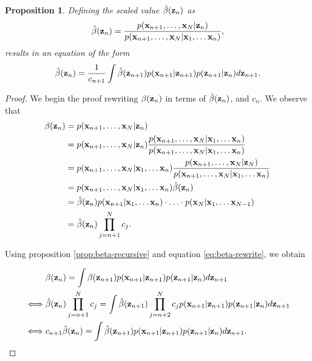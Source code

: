 \documentclass[11pt]{article}
\numberwithin{equation}{section}
\newcommand{\x}{{\bf x}}
\newcommand{\z}{{\bf z}}
\newtheorem{proposition}{Proposition}[section]
\begin{document}
\begin{proposition} \label{prop:beta-hat}
	Defining the scaled value $\hat\beta(\z_n)$ as
	\begin{equation}
		\hat\beta(\z_n) = \frac{p(\x_{n+1}, \ldots, \x_N \vert \z_n)}{p(\x_{n+1}, \ldots, \x_N \vert \x_1, \ldots \x_n)},
	\end{equation}
	results in an equation of the form
	\begin{equation}
		\hat\beta(\z_n) = \frac{1}{c_{n+1}}\int \hat\beta(\z_{n+1})p(\x_{n+1}\vert\z_{n+1})p(\z_{n+1}\vert\z_n) d\z_{n+1}.
	\end{equation}
\end{proposition}

\begin{proof}
	We begin the proof rewriting $\beta(\z_n)$ in terms of $\hat\beta(\z_n)$, and $c_n$. We observe that
	\begin{align}
		\beta(\z_n) &= p(\x_{n+1}, \ldots, \x_N \vert \z_n)\\
		&= p(\x_{n+1}, \ldots, \x_N \vert \z_n) \frac{p(\x_{n+1}, \ldots, \x_N \vert \x_1, \ldots \x_n)}{p(\x_{n+1}, \ldots, \x_N \vert \x_1, \ldots \x_n)} \\
		&= p(\x_{n+1}, \ldots, \x_N \vert \x_1, \ldots \x_n) \frac{p(\x_{n+1}, \ldots, \x_N \vert \z_N)}{p(\x_{n+1}, \ldots, \x_N \vert \x_1, \ldots \x_n)}\\
		&= p(\x_{n+1}, \ldots, \x_N \vert \x_1, \ldots \x_n) \hat\beta(\z_n)\\
		&= \hat\beta(\z_n) p(\x_{n+1} \vert \x_1, \ldots \x_n) \cdot \ldots \cdot p(\x_{N} \vert \x_1, \ldots \x_{N-1})\\
		&= \hat\beta(\z_n) \prod_{j=n+1}^N c_j \label{eq:beta-rewrite}.
	\end{align}
	
	Using proposition \ref{prop:beta-recursive} and equation \eqref{eq:beta-rewrite}, we obtain
	
	\begin{align}
		&\beta(\z_n) = \int  \beta(\z_{n+1})p(\x_{n+1}\vert \z_{n+1}) p(\z_{n+1}\vert \z_n) d\z_{n+1}\\
		\iff& \hat\beta(\z_n) \prod_{j=n+1}^N c_j = \int \hat\beta(\z_{n+1}) \prod_{j=n+2}^N c_jp(\x_{n+1}\vert \z_{n+1}) p(\z_{n+1}\vert \z_n) d\z_{n+1}\\
		\iff& c_{n+1} \hat\beta(\z_n) = \int  \hat\beta(\z_{n+1}) p(\x_{n+1}\vert \z_{n+1}) p(\z_{n+1}\vert \z_n) d\z_{n+1}.
	\end{align}
\end{proof}
\end{document}
